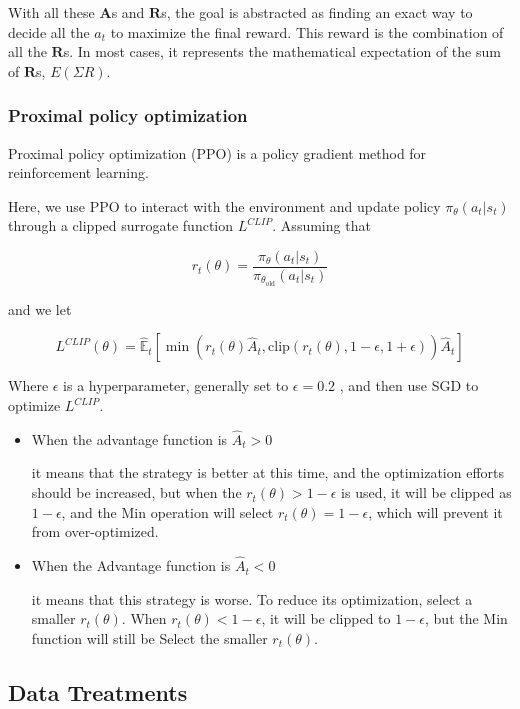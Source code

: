 \documentclass{mcmthesis}
\begin{document}
With all these $\pmb{A}$s and $\pmb{R}$s,
the goal is abstracted as finding an exact way to decide all the $a_t$
to maximize the final reward.
This reward is the combination of all the $\pmb{R}$s.
In most cases, it represents the mathematical expectation of the sum of $\pmb{R}$s,
$E(\Sigma R)$.

\subsubsection{Proximal policy optimization}

Proximal policy optimization (PPO) is a policy gradient method for reinforcement learning.

Here, we use PPO to interact with the environment and update policy $\pi_\theta(a_t | s_t)$ through a clipped surrogate function $L^{CLIP}$. Assuming that

\[
r_t(\theta) = \frac{\pi_{\theta}(a_t | s_t)}{\pi_{\theta_{\mathrm{old}}}(a_t | s_t)}
\]

and we let

\[
  L^{CLIP}(\theta) = \hat{\mathbb{E}}_t \left[ \min \left(r_t(\theta) \hat{A}_t, \mathrm{clip}(r_t(\theta), 1 - \epsilon, 1 + \epsilon)\right) \hat{A}_t \right]
\]

Where $\epsilon$ is a hyperparameter, generally set to $\epsilon = 0.2$ , and then use SGD to optimize $L^{CLIP}$.

\begin{itemize}
  \item When the advantage function is $\hat{A}_t > 0$ \par
  it means that the strategy is better at this time, and the optimization efforts should be increased, but when the $r_t(\theta) > 1 - \epsilon$ is used, it will be clipped as $1 - \epsilon$, and the Min operation will select $r_t(\theta) = 1 - \epsilon$, which will prevent it from over-optimized.
  \item When the Advantage function is $\hat{A}_t < 0$ \par
  it means that this strategy is worse. To reduce its optimization, select a smaller $r_t(\theta)$. When $r_t(\theta) < 1 - \epsilon$, it will be clipped to $1 - \epsilon$, but the Min function will still be Select the smaller $r_t(\theta)$.

\end{itemize}

\subsection{Data Treatments}
\end{document}
